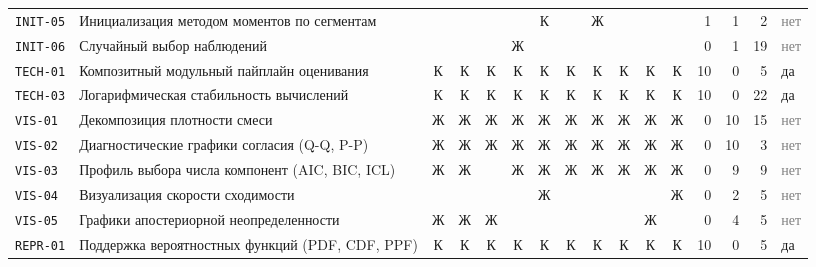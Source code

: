 \documentclass[10pt,a4paper]{article}
\begin{document}
\begin{landscape}
{\begin{longtable}{@{}l >{\raggedright\arraybackslash}p{8.2cm} *{10}{c} r r r l@{}}
\texttt{INIT-05} & Инициализация методом моментов по сегментам &  &  &  &  & \cellcolor{hm!70}К &  & \cellcolor{hm!22}Ж &  &  &  & 1 & 1 & 2 & \textcolor{gray}{нет} \\
\texttt{INIT-06} & Случайный выбор наблюдений &  &  &  & \cellcolor{hm!22}Ж &  &  &  &  &  &  & 0 & 1 & 19 & \textcolor{gray}{нет} \\
\texttt{TECH-01} & Композитный модульный пайплайн оценивания & \cellcolor{hm!70}К & \cellcolor{hm!70}К & \cellcolor{hm!70}К & \cellcolor{hm!70}К & \cellcolor{hm!70}К & \cellcolor{hm!70}К & \cellcolor{hm!70}К & \cellcolor{hm!70}К & \cellcolor{hm!70}К & \cellcolor{hm!70}К & 10 & 0 & 5 & \cellcolor{yes!30}да \\
\texttt{TECH-03} & Логарифмическая стабильность вычислений & \cellcolor{hm!70}К & \cellcolor{hm!70}К & \cellcolor{hm!70}К & \cellcolor{hm!70}К & \cellcolor{hm!70}К & \cellcolor{hm!70}К & \cellcolor{hm!70}К & \cellcolor{hm!70}К & \cellcolor{hm!70}К & \cellcolor{hm!70}К & 10 & 0 & 22 & \cellcolor{yes!30}да \\
\texttt{VIS-01} & Декомпозиция плотности смеси & \cellcolor{hm!22}Ж & \cellcolor{hm!22}Ж & \cellcolor{hm!22}Ж & \cellcolor{hm!22}Ж & \cellcolor{hm!22}Ж & \cellcolor{hm!22}Ж & \cellcolor{hm!22}Ж & \cellcolor{hm!22}Ж & \cellcolor{hm!22}Ж & \cellcolor{hm!22}Ж & 0 & 10 & 15 & \textcolor{gray}{нет} \\
\texttt{VIS-02} & Диагностические графики согласия (Q-Q, P-P) & \cellcolor{hm!22}Ж & \cellcolor{hm!22}Ж & \cellcolor{hm!22}Ж & \cellcolor{hm!22}Ж & \cellcolor{hm!22}Ж & \cellcolor{hm!22}Ж & \cellcolor{hm!22}Ж & \cellcolor{hm!22}Ж & \cellcolor{hm!22}Ж & \cellcolor{hm!22}Ж & 0 & 10 & 3 & \textcolor{gray}{нет} \\
\texttt{VIS-03} & Профиль выбора числа компонент (AIC, BIC, ICL) & \cellcolor{hm!22}Ж & \cellcolor{hm!22}Ж &  & \cellcolor{hm!22}Ж & \cellcolor{hm!22}Ж & \cellcolor{hm!22}Ж & \cellcolor{hm!22}Ж & \cellcolor{hm!22}Ж & \cellcolor{hm!22}Ж & \cellcolor{hm!22}Ж & 0 & 9 & 9 & \textcolor{gray}{нет} \\
\texttt{VIS-04} & Визуализация скорости сходимости &  &  &  &  & \cellcolor{hm!22}Ж &  &  &  &  & \cellcolor{hm!22}Ж & 0 & 2 & 5 & \textcolor{gray}{нет} \\
\texttt{VIS-05} & Графики апостериорной неопределенности & \cellcolor{hm!22}Ж & \cellcolor{hm!22}Ж & \cellcolor{hm!22}Ж &  &  &  &  &  & \cellcolor{hm!22}Ж &  & 0 & 4 & 5 & \textcolor{gray}{нет} \\
\texttt{REPR-01} & Поддержка вероятностных функций (PDF, CDF, PPF) & \cellcolor{hm!70}К & \cellcolor{hm!70}К & \cellcolor{hm!70}К & \cellcolor{hm!70}К & \cellcolor{hm!70}К & \cellcolor{hm!70}К & \cellcolor{hm!70}К & \cellcolor{hm!70}К & \cellcolor{hm!70}К & \cellcolor{hm!70}К & 10 & 0 & 5 & \cellcolor{yes!30}да \\

\end{longtable}}
\end{landscape}
\end{document}
